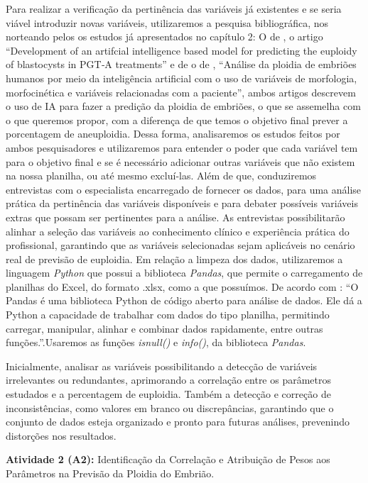 Para realizar a verificação da pertinência das variáveis já existentes e se seria viável introduzir novas variáveis, utilizaremos a pesquisa bibliográfica, nos norteando pelos os estudos já apresentados no capítulo 2: O de , o artigo “Development of an artifcial intelligence based model for predicting the euploidy of blastocysts in PGT‐A treatments” e de o de , “Análise da ploidia de embriões humanos por meio da inteligência artificial com o uso de variáveis de morfologia, morfocinética e variáveis relacionadas com a paciente”, ambos artigos descrevem o uso de IA para fazer a predição da ploidia de embriões, o que se assemelha com o que queremos propor, com a diferença de que temos o objetivo final prever a porcentagem de aneuploidia. Dessa forma, analisaremos os estudos feitos por ambos pesquisadores e utilizaremos para entender o poder que cada variável tem para o objetivo final e se é necessário adicionar outras variáveis que não existem na nossa planilha, ou até mesmo excluí-las. Além de que, conduziremos entrevistas com o especialista encarregado de fornecer os dados, para uma análise prática da pertinência das variáveis disponíveis e para debater possíveis variáveis extras que possam ser pertinentes para a análise. As entrevistas possibilitarão alinhar a seleção das variáveis ao conhecimento clínico e experiência prática do profissional, garantindo que as variáveis selecionadas sejam aplicáveis no cenário real de previsão de euploidia. Em relação a limpeza dos dados, utilizaremos a linguagem \textit{Python} que possui a biblioteca \textit{Pandas}, que permite o carregamento de planilhas do Excel, do formato .xlsx, como a que possuímos. De acordo com : “O Pandas é uma biblioteca Python de código aberto para análise de dados. Ele dá a Python a capacidade de trabalhar com dados do tipo planilha, permitindo carregar, manipular, alinhar e combinar dados rapidamente, entre outras funções.”.Usaremos as funções \textit{isnull()} e \textit{info()}, da biblioteca \textit{Pandas}.

Inicialmente, analisar as variáveis possibilitando a detecção de variáveis irrelevantes ou redundantes, aprimorando a correlação entre os parâmetros estudados e a percentagem de euploidia. Também a detecção e correção de inconsistências, como valores em branco ou discrepâncias, garantindo que o conjunto de dados esteja organizado e pronto para futuras análises, prevenindo distorções nos resultados. 

\textbf{Atividade 2 (A2):} Identificação da Correlação e Atribuição de Pesos aos Parâmetros na Previsão da Ploidia do Embrião.

